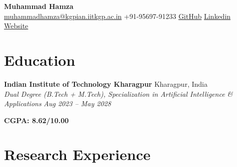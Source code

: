 \documentclass[10.5pt, a4paper]{article}
\newcommand{\expEntry}[4]{%
    \hspace*{-16pt}%
    \textbf{#1} \hfill #2 \\
    \hspace*{-12pt}%
    \textit{#3} \hfill \textit{#4} \\[-4pt]
    \vspace{-6pt}
}
\begin{document}
\pagestyle{empty}

\begin{center}
    {\LARGE\bfseries\color{msblue} Muhammad Hamza}\\[4pt]
     \href{mailto:muhammadhamza@kgpian.iitkgp.ac.in}{muhammadhamza@kgpian.iitkgp.ac.in} \quad
     +91-95697-91233 \quad
     \href{https://github.com/hamza-faarooq}{GitHub} \quad
     \href{https://www.linkedin.com/in/muhammad-hamza-iftekhar-hamid-784903204/}{Linkedin} \quad
     \href{https://hamza-faarooq.github.io}{Website}
\end{center}
\vspace{3pt}

\section{Education}
\expEntry
    {Indian Institute of Technology Kharagpur}{Kharagpur, India}
    {Dual Degree (B.Tech + M.Tech), Specialization in Artificial Intelligence \& Applications}{Aug 2023 -- May 2028}

\vspace{-6pt}
\hspace{-1pt}\textbf{CGPA: 8.62/10.00}
    \vspace{-2pt}

\section{Research Experience}
    \vspace{1pt}
\end{document}
